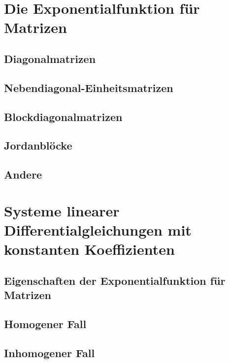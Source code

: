 \documentclass[a4paper, 11pt, accentcolor = tud3b]{tudreport}
\begin{document}
		\section{Die Exponentialfunktion für Matrizen} %

			\subsection{Diagonalmatrizen} %

			\subsection{Nebendiagonal-Einheitsmatrizen} %

			\subsection{Blockdiagonalmatrizen} %

			\subsection{Jordanblöcke} %

			\subsection{Andere} %

		\section{Systeme linearer Differentialgleichungen mit konstanten Koeffizienten} %

			\subsection{Eigenschaften der Exponentialfunktion für Matrizen} %

			\subsection{Homogener Fall} %

			\subsection{Inhomogener Fall} %
\end{document}
